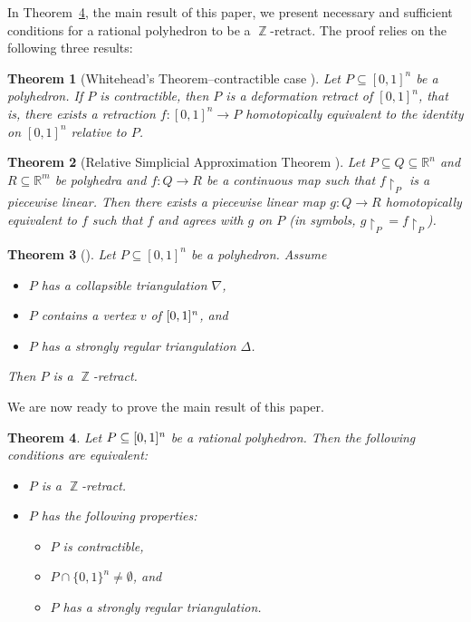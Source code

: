 \documentclass[reqno, draft]{amsart}
\newtheorem{theorem}{Theorem}[section]
\theoremstyle{definition}
\begin{document}
In Theorem~\ref{Thm:Main}, the main result of this paper, 
we present necessary and sufficient conditions 
for a rational polyhedron to be a $\operatorname{\mathbb{Z}}$-retract. 
The proof relies on the following three results:

\begin{theorem}[{Whitehead's Theorem--contractible case \cite[Theorem~4.5]{Hat2001}}]
\label{Thm:Whitehead}
Let $P\subseteq [0,1]^n$ be a polyhedron. 
If $P$ is contractible, then $P$ is a {\em deformation retract} of $[0,1]^n$, 
that is, there exists a retraction $f\colon [0,1]^n\to P$ 
homotopically equivalent to the identity on $[0,1]^n$ 
relative to $P$.  
\end{theorem}

\begin{theorem}[{Relative  Simplicial Approximation Theorem 
\cite[Theorem~3.2.1]{Sta1967}}]
\label{Thm:SimplicialApproximation}
Let $P\subseteq Q\subseteq {\mathbb{R}}^n$ and $R\subseteq {\mathbb{R}}^m$ 
be polyhedra 
and $f\colon Q\to R$ be a continuous map 
such that $f{\upharpoonright}_P$ is a piecewise linear. 
Then there exists a piecewise linear map  $g\colon Q\to R$  
 homotopically equivalent to $f$  such that 
$f$  and agrees with   $g$ on $P$ 
(in symbols,   $g{\upharpoonright}_P = f{\upharpoonright}_P$).
\end{theorem}

\begin{theorem}[{\cite[Theorem~5.1]{CM2013}}]
    \label{theorem:collapsible}
Let $P\subseteq [0,1]^{n}$ be a   polyhedron. 
Assume
\begin{itemize}
\item[(i)] $P$ has a collapsible  triangulation $\nabla$,
\item[(ii)] $P$ contains a vertex $v$ of ${[0,1]^{\it n}}$, and
\item[(iii)] $P$ has a strongly regular triangulation  $\Delta$.
\end{itemize}
Then  $P$ is a $\operatorname{\mathbb{Z}}$-retract.
\end{theorem}

We are now ready to prove the main result of this paper.

\begin{theorem}\label{Thm:Main}
Let $P\subseteq {[0,1]^{\it n}}$ be a rational  polyhedron. 
Then the following conditions are equivalent:
\begin{itemize}

  \item[(a)] $P$ is a $\operatorname{\mathbb{Z}}$-retract.
  
  \item[(b)] $P$ has the following properties:
    \begin{itemize}
        \item[(i)] $P$ is contractible,
        \item[(ii)] $P\cap\{0,1\}^n\neq\emptyset$, and
        \item[(iii)] $P$ has a strongly regular triangulation.
     \end{itemize}

\end{itemize}

\end{theorem}
\end{document}
